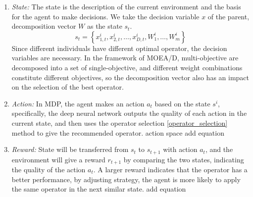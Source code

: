 \documentclass[journal]{IEEEtran}
\newcommand{\TODO}[1]{\textcolor[rgb]{1.00,0.40,0.22}{#1}}
\begin{document}
\begin{enumerate}
  \item \textit{State:}
        The state is the description of the current environment and the basis for the agent to make decisions. We take the decision variable $x$ of the parent, decomposition vector $W$ as the state $s_t$.
        \begin{equation}
          s_{t}=\left\{x_{1,t}^i, x_{2,t}^i, \ldots, x_{D,t}^i, W_{1}^{i}, \ldots, W_{m}^{i}\right\}
        \end{equation}
        Since different individuals have different optimal operator, the decision variables are necessary. In the framework of MOEA/D, multi-objective are decomposed into a set of single-objective, and different weight combinations constitute different objectives, so the decomposition vector also has an impact on the selection of the best operator.
  \item \textit{Action:}
        In MDP, the agent makes an action $a_t$ based on the state $s^i$, specifically, the deep neural network outputs the quality of each action in the current state, and then uses the operator selection \ref{operator_selection} method to give the recommended operator.
        \TODO{action space}
        \TODO{add equation}
  \item \textit{Reward:}
        State will be transferred from $s_{t}$ to $s_{t+1}$ with action $a_t$, and the environment will give a reward $r_{t+1}$ by comparing the two states, indicating the quality of the action $a_t$. A larger reward indicates that the operator has a better performance, by adjusting strategy, the agent is more likely to apply the same operator in the next similar state.
        \TODO{add equation}
\end{enumerate}
\end{document}
